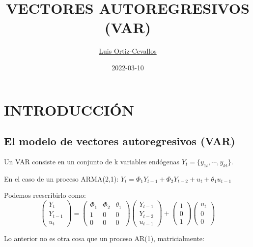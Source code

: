 \documentclass[
]{book}
\title{VECTORES AUTOREGRESIVOS (VAR)}
\author{\href{https://ortiz-cevallos.github.io/MYSELF/}{Luis Ortiz-Cevallos}}
\date{2022-03-10}
\begin{document}
\maketitle

{
\setcounter{tocdepth}{1}
\tableofcontents
}
\hypertarget{introducciuxf3n}{%
\chapter{INTRODUCCIÓN}\label{introducciuxf3n}}

\hypertarget{el-modelo-de-vectores-autoregresivos-var}{%
\section{El modelo de vectores autoregresivos (VAR)}\label{el-modelo-de-vectores-autoregresivos-var}}

Un VAR consiste en un conjunto de k variables endógenas \(Y_{t}=\{y_{1t},\cdots, y_{kt}\}\).

En el caso de un proceso ARMA(2,1):
\(Y_t = \Phi_1Y_{t-1} + \Phi_2Y_{t-2} + u_t + \theta_1u_{t-1}\)

Podemos reescribirlo como:
\begin{equation}
\left( \begin{array}{c}
Y_{t} \\
Y_{t-1} \\
u_{t} 
\end{array}
\right)=\left( \begin{array}{ccc}
\Phi_1 & \Phi_2 & \theta_1\\
1 & 0 & 0\\
0 & 0 & 0
\end{array}
\right) \left( \begin{array}{c}
Y_{t-1} \\
Y_{t-2} \\
u_{t-1} 
\end{array}
\right)+\left( \begin{array}{c}
1\\
0 \\
1
\end{array}
\right) \left( \begin{array}{c}
u_{t} \\
0 \\
0
\end{array}
\right) 
\nonumber
\end{equation}

Lo anterior no es otra cosa que un proceso AR(1), matricialmente:
\end{document}
